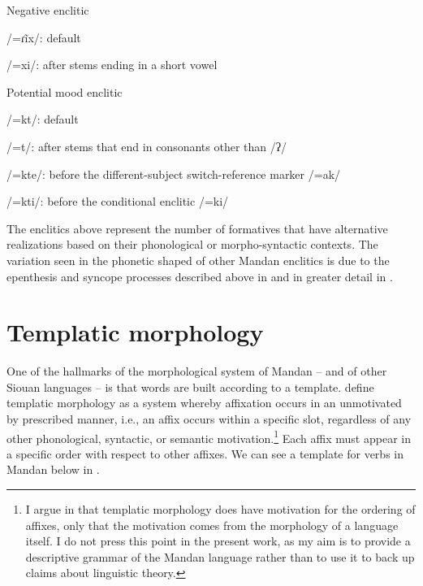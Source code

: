 \begin{exe}
    \item\label{CHSkExNEG} Negative enclitic
        \begin{xlist}
            \item\label{CHSkExNEGa} /=ɾĩx/: default
            \item\label{CHSkExNEGb} /=xi/: after stems ending in a short vowel
        \end{xlist}
    \item\label{CHSkExPOT} Potential mood enclitic
        \begin{xlist}
            \item\label{CHSkExPOTa} /=kt/: default
            \item\label{CHSkExPOTb} /=t/: after stems that end in consonants other than /ʔ/
            \item\label{CHSkExPOTc} /=kte/: before the different-subject switch-reference marker /=ak/
            \item\label{CHSkExPOTd} /=kti/: before the conditional enclitic /=ki/
        \end{xlist}
\end{exe}

The enclitics above represent the number of formatives that have alternative realizations based on their phonological or morpho-syntactic contexts. The variation seen in the phonetic shaped of other Mandan enclitics is due to the epenthesis and syncope processes described above in  and in greater detail in .


\section{Templatic morphology}\label{CHSk4}
\largerpage
One of the hallmarks of the morphological system of Mandan -- and of other Siouan languages -- is that words are built according to a template. \citet[112]{manovaaronoff2010} define templatic morphology as a system whereby affixation occurs in an unmotivated by prescribed manner, i.e., an affix occurs within a specific slot, regardless of any other phonological, syntactic, or semantic motivation.\footnote{I argue in \citet[339]{kasak2019} that templatic morphology does have motivation for the ordering of affixes, only that the motivation comes from the morphology of a language itself. I do not press this point in the present work, as my aim is to provide a descriptive grammar of the Mandan language rather than to use it to back up claims about linguistic theory.} Each affix must appear in a specific order with respect to other affixes. We can see a template for verbs in Mandan below in .

